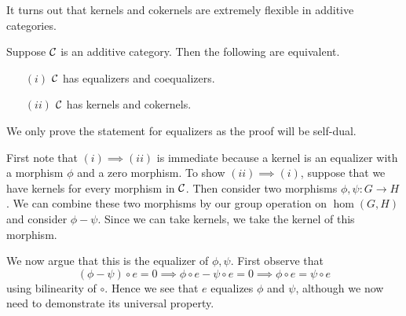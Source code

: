 It turns out that kernels and cokernels are extremely flexible in additive categories.


\begin{proposition}
    Suppose $\mathcal{C}$ is an additive category. Then the following are equivalent. 
    \begin{itemize}
        \item[$(i)$] $\mathcal{C}$ has equalizers and coequalizers. 
        \item[$(ii)$] $\mathcal{C}$ has kernels and cokernels.
    \end{itemize}
\end{proposition}

\begin{prf}
    We only prove the statement for equalizers as the proof will be self-dual. 

    First note that $(i) \implies (ii)$ is immediate because a kernel is 
    an equalizer with a morphism $\phi$ and a zero morphism. To show $(ii) \implies (i)$, 
    suppose that we have kernels for every morphism in $\mathcal{C}$. Then consider two 
    morphisms $\phi, \psi: G \to H$. We can combine these two morphisms by our 
    group operation on $\hom(G, H)$ and consider $\phi - \psi$. Since we can take kernels, we 
    take the kernel of this morphism.
    \begin{center}
    \end{center}
    We now argue that this is the equalizer of $\phi, \psi$. First observe that 
    \[
        (\phi - \psi)\circ e = 0 \implies \phi \circ e - \psi \circ e = 0 \implies \phi \circ e = \psi \circ e
    \]
    using bilinearity of $\circ$. Hence we see that $e$ equalizes $\phi$ and $\psi$, although 
    we now need to demonstrate its universal property. 


\end{prf}
